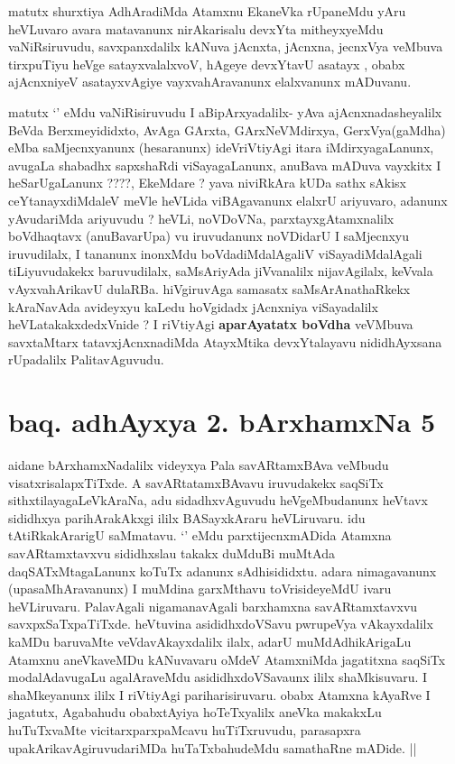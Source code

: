 \begin{artha}
matutx shurxtiya AdhAradiMda Atamxnu EkaneVka rUpaneMdu yAru heVLuvaro avara 
matavanunx nirAkarisalu devxYta mitheyxyeMdu vaNiRsiruvudu, savxpanxdalilx 
kANuva jAcnxta, jAcnxna, jecnxVya veMbuva tirxpuTiyu heVge satayxvalalxvoV, 
hAgeye devxYtavU asatayx , obabx ajAcnxniyeV asatayxvAgiye  vayxvahAravanunx 
elalxvanunx mADuvanu. 

matutx `\stext' eMdu vaNiRisiruvudu I aBipArxyadalilx- yAva ajAcnxnadasheyalilx 
BeVda Berxmeyididxto, AvAga GArxta, GArxNeVMdirxya, GerxVya(gaMdha) eMba 
saMjecnxyanunx (hesaranunx) ideVriVtiyAgi itara iMdirxyagaLanunx, avugaLa 
shabadhx sapxshaRdi viSayagaLanunx, anuBava mADuva vayxkitx I heSarUgaLanunx ????,
EkeMdare ? yava niviRkAra kUDa sathx sAkisx ceYtanayxdiMdaleV meVle heVLida viBAgavanunx 
elalxrU ariyuvaro, adanunx yAvudariMda ariyuvudu ? heVLi, noVDoVNa, parxtayxgAtamxnalilx 
boVdhaqtavx (anuBavarUpa) vu iruvudanunx  noVDidarU I saMjecnxyu iruvudilalx, I tananunx 
inonxMdu boVdadiMdalAgaliV viSayadiMdalAgali tiLiyuvudakekx baruvudilalx, saMsAriyAda 
jiVvanalilx nijavAgilalx, keVvala vAyxvahArikavU dulaRBa. hiVgiruvAga samasatx 
saMsArAnathaRkekx kAraNavAda avideyxyu kaLedu hoVgidadx jAcnxniya viSayadalilx 
heVLatakakxdedxVnide ? I riVtiyAgi \textbf{aparAyatatx boVdha} veVMbuva savxtaMtarx 
tatavxjAcnxnadiMda AtayxMtika devxYtalayavu nididhAyxsana rUpadalilx PalitavAguvudu.
\end{artha}

\section*{baq. adhAyxya 2. bArxhamxNa 5}

\begin{center}
\end{center}

\begin{artha}
aidane bArxhamxNadalilx videyxya Pala savARtamxBAva veMbudu visatxrisalapxTiTxde. A savARtatamxBAvavu iruvudakekx saqSiTx sithxtilayagaLeVkAraNa, adu sidadhxvAguvudu heVgeMbudanunx heVtavx sididhxya parihArakAkxgi ililx BASayxkAraru heVLiruvaru. idu tAtiRkakArarigU saMmatavu. `\stext' eMdu parxtijecnxmADida Atamxna savARtamxtavxvu sididhxslau takakx duMduBi muMtAda daqSATxMtagaLanunx koTuTx adanunx sAdhisididxtu. adara nimagavanunx (upasaMhAravanunx) I muMdina garxMthavu toVrisideyeMdU ivaru heVLiruvaru. PalavAgali nigamanavAgali barxhamxna savARtamxtavxvu savxpxSaTxpaTiTxde. heVtuvina asididhxdoVSavu pwrupeVya vAkayxdalilx kaMDu baruvaMte veVdavAkayxdalilx ilalx, adarU muMdAdhikArigaLu Atamxnu aneVkaveMDu kANuvavaru oMdeV AtamxniMda jagatitxna saqSiTx modalAdavugaLu agalAraveMdu asididhxdoVSavaunx ililx shaMkisuvaru. I shaMkeyanunx ililx I riVtiyAgi pariharisiruvaru. obabx Atamxna kAyaRve I jagatutx, Agabahudu obabxtAyiya hoTeTxyalilx aneVka makakxLu huTuTxvaMte vicitarxparxpaMcavu huTiTxruvudu, parasapxra upakArikavAgiruvudariMDa huTaTxbahudeMdu samathaRne mADide. ||
\end{artha}


